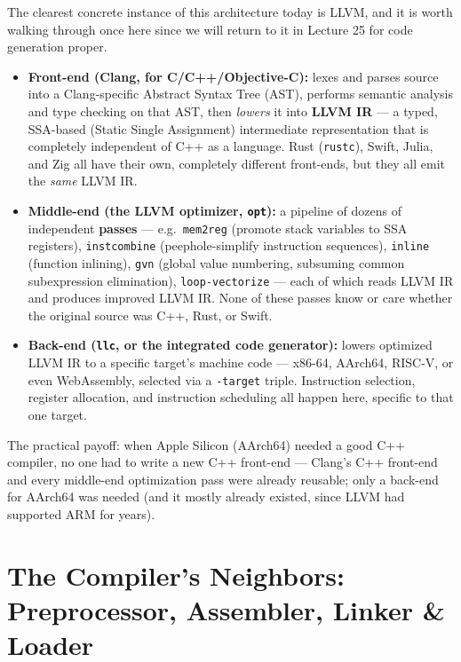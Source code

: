 \documentclass[11pt]{article}
\begin{document}
\begin{enrichment}
The clearest concrete instance of this architecture today is LLVM, and it is worth walking
through once here since we will return to it in Lecture 25 for code generation proper.
\begin{itemize}
  \item \textbf{Front-end (Clang, for C/C++/Objective-C):} lexes and parses source into a
  Clang-specific Abstract Syntax Tree (AST), performs semantic analysis and type checking on
  that AST, then \emph{lowers} it into \textbf{LLVM IR} --- a typed, SSA-based (Static Single
  Assignment) intermediate representation that is completely independent of C++ as a language.
  Rust (\texttt{rustc}), Swift, Julia, and Zig all have their own, completely different
  front-ends, but they all emit the \emph{same} LLVM IR.
  \item \textbf{Middle-end (the LLVM optimizer, \texttt{opt}):} a pipeline of dozens of
  independent \textbf{passes} --- e.g.\ \texttt{mem2reg} (promote stack variables to SSA
  registers), \texttt{instcombine} (peephole-simplify instruction sequences),
  \texttt{inline} (function inlining), \texttt{gvn} (global value numbering, subsuming common
  subexpression elimination), \texttt{loop-vectorize} --- each of which reads LLVM IR and
  produces improved LLVM IR. None of these passes know or care whether the original source was
  C++, Rust, or Swift.
  \item \textbf{Back-end (\texttt{llc}, or the integrated code generator):} lowers optimized
  LLVM IR to a specific target's machine code --- x86-64, AArch64, RISC-V, or even WebAssembly,
  selected via a \texttt{-target} triple. Instruction selection, register allocation, and
  instruction scheduling all happen here, specific to that one target.
\end{itemize}
The practical payoff: when Apple Silicon (AArch64) needed a good C++ compiler, no one had to
write a new C++ front-end --- Clang's C++ front-end and every middle-end optimization pass were
already reusable; only a back-end for AArch64 was needed (and it mostly already existed, since
LLVM had supported ARM for years).
\end{enrichment}

\section{The Compiler's Neighbors: Preprocessor, Assembler, Linker \& Loader}
\end{document}
